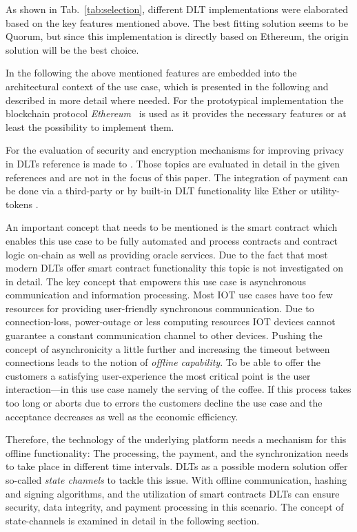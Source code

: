 \documentclass[conference]{IEEEtran}
\begin{document}
As shown in Tab.~\ref{tab:selection}, different DLT implementations were elaborated based on the key features mentioned above. The best fitting solution seems to be Quorum, but since this implementation is directly based on Ethereum, the origin solution will be the best choice.

In the following the above mentioned features are embedded into the architectural context of the use case, which is presented in the following and described in more detail where needed. For the prototypical implementation the blockchain protocol \emph{Ethereum}~\cite{buterin2013} is used as it provides the necessary features or at least the possibility to implement them.

For the evaluation of security and encryption mechanisms for improving privacy in DLTs reference is made to \cite{Privacy}. Those topics are evaluated in detail in the given references and are not in the focus of this paper. The integration of payment can be done via a third-party or by built-in DLT functionality like Ether or utility-tokens \cite{Tokens}.

An important concept that needs to be mentioned is the smart contract which enables this use case to be fully automated and process contracts and contract logic on-chain as well as providing oracle services. Due to the fact that most modern DLTs offer smart contract functionality this topic is not investigated on in detail. The key concept that empowers this use case is asynchronous communication and information processing. Most IOT use cases have too few resources for providing user-friendly synchronous communication. Due to connection-loss, power-outage or less computing resources IOT devices cannot guarantee a constant communication channel to other devices. Pushing the concept of asynchronicity a little further and increasing the timeout between connections leads to the notion of \emph{offline capability}. To be able to offer the customers a satisfying user-experience the most critical point is the user interaction---in this use case namely the serving of the coffee. If this process takes too long or aborts due to errors the customers decline the use case and the acceptance decreases as well as the economic efficiency.

Therefore, the technology of the underlying platform needs a mechanism for this offline functionality: The processing, the payment, and the synchronization needs to take place in different time intervals. DLTs as a possible modern solution offer so-called \emph{state channels} to tackle this issue. With offline communication, hashing and signing algorithms, and the utilization of smart contracts DLTs can ensure security, data integrity, and payment processing in this scenario. The concept of state-channels is examined in detail in the following section.
\end{document}
